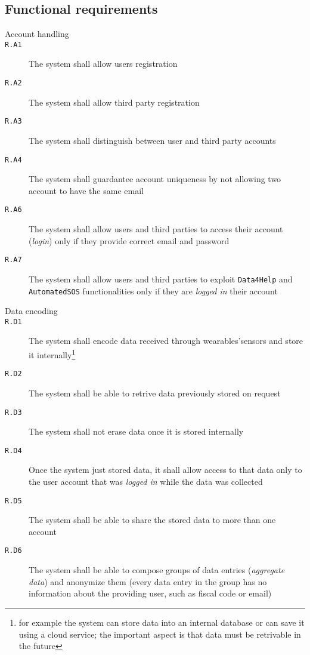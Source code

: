 
  \subsection{Functional requirements}

    \begin{description}
      \item[Account handling]
      \item[\texttt{R.A1}] The system shall allow users registration
      \item[\texttt{R.A2}] The system shall allow third party registration
      \item[\texttt{R.A3}] The system shall distinguish between user and third party accounts
      \item[\texttt{R.A4}] The system shall guardantee account uniqueness by not allowing two account to have the same email
      \item[\texttt{R.A6}] The system shall allow users and third parties to access their account (\textit{login}) only if they provide correct email and password
      \item[\texttt{R.A7}] The system shall allow users and third parties to exploit \texttt{Data4Help} and \texttt{AutomatedSOS} functionalities only if they are \textit{logged in} their account

      \item[Data encoding]
      \item[\texttt{R.D1}] The system shall encode data received through wearables'sensors and store it internally\footnote{for example the system can store data into an internal database or can save it using a cloud service; the important aspect is that data must be retrivable in the future}
      \item[\texttt{R.D2}] The system shall be able to retrive data previously stored on request
      \item[\texttt{R.D3}] The system shall not erase data once it is stored internally
      \item[\texttt{R.D4}] Once the system just stored data, it shall allow access to that data only to the user account that was \textit{logged in} while the data was collected
      \item[\texttt{R.D5}] The system shall be able to share the stored data to more than one account
      \item[\texttt{R.D6}] The system shall be able to compose groups of data entries (\textit{aggregate data}) and anonymize them (every data entry in the group has no information about the providing user, such as fiscal code or email)


\end{description}
